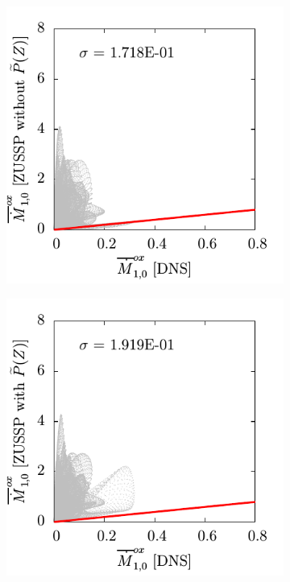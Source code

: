 \begin{figure}[ht]
  \centering
  \begin{subfigure}[b]{0.375\linewidth}
    \centering
    \includegraphics[width=\linewidth]{ch-subfiltermodeling/figures/lin-Mox3vsMox6-r3D-32}
  \end{subfigure}%
  \begin{subfigure}[b]{0.375\linewidth}
    \centering
    \includegraphics[width=\linewidth]{ch-subfiltermodeling/figures/lin-Mox4vsMox6-r3D-32}

\end{subfigure}
\end{figure}
